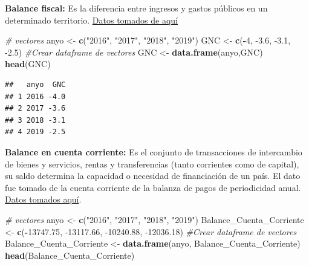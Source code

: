 \documentclass[
  11pt,
  a4paper,
]{book}
\newenvironment{Shaded}{\begin{snugshade}}{\end{snugshade}}
\newcommand{\CommentTok}[1]{\textcolor[rgb]{0.56,0.35,0.01}{\textit{#1}}}
\newcommand{\DecValTok}[1]{\textcolor[rgb]{0.00,0.00,0.81}{#1}}
\newcommand{\FloatTok}[1]{\textcolor[rgb]{0.00,0.00,0.81}{#1}}
\newcommand{\KeywordTok}[1]{\textcolor[rgb]{0.13,0.29,0.53}{\textbf{#1}}}
\newcommand{\NormalTok}[1]{#1}
\newcommand{\OperatorTok}[1]{\textcolor[rgb]{0.81,0.36,0.00}{\textbf{#1}}}
\newcommand{\StringTok}[1]{\textcolor[rgb]{0.31,0.60,0.02}{#1}}
\begin{document}
\textbf{Balance fiscal:} Es la diferencia entre ingresos y gastos
públicos en un determinado territorio.
\href{http://www.urf.gov.co/webcenter/portal/EntidadesFinancieras/pages_EntidadesFinancieras/PoliticaFiscal/bgg/balancefiscalgobiernocentral?_afrLoop=6729623401772216\&_afrWindowMode=2\&Adf-Window-Id=mof7t7k7j\&_afrFS=16\&_afrMT=screen\&_afrMFW=768\&_afrMFH=720\&_afrMFDW=1536\&_afrMFDH=864\&_afrMFC=8\&_afrMFCI=0\&_afrMFM=0\&_afrMFR=120\&_afrMFG=0\&_afrMFS=0\&_afrMFO=0}{Datos
tomados de aquí}

\begin{Shaded}
\begin{Highlighting}[]
\CommentTok{# vectores }
\NormalTok{anyo <-}\StringTok{ }\KeywordTok{c}\NormalTok{(}\StringTok{"2016"}\NormalTok{, }\StringTok{"2017"}\NormalTok{, }\StringTok{"2018"}\NormalTok{, }\StringTok{"2019"}\NormalTok{)}
\NormalTok{GNC <-}\StringTok{ }\KeywordTok{c}\NormalTok{(}\OperatorTok{-}\DecValTok{4}\NormalTok{, }\FloatTok{-3.6}\NormalTok{, }\FloatTok{-3.1}\NormalTok{, }\FloatTok{-2.5}\NormalTok{)}
\CommentTok{#Crear dataframe de vectores}
\NormalTok{GNC <-}\StringTok{ }\KeywordTok{data.frame}\NormalTok{(anyo,GNC)}
\KeywordTok{head}\NormalTok{(GNC)}
\end{Highlighting}
\end{Shaded}

\begin{verbatim}
##   anyo  GNC
## 1 2016 -4.0
## 2 2017 -3.6
## 3 2018 -3.1
## 4 2019 -2.5
\end{verbatim}

\textbf{Balance en cuenta corriente:} Es el conjunto de transacciones de
intercambio de bienes y servicios, rentas y transferencias (tanto
corrientes como de capital), su saldo determina la capacidad o necesidad
de financiación de un país. El dato fue tomado de la cuenta corriente de
la balanza de pagos de periodicidad anual.
\href{https://www.banrep.gov.co/es/estadisticas/balanza-pagos}{Datos
tomados aquí}.

\begin{Shaded}
\begin{Highlighting}[]
\CommentTok{# vectores }
\NormalTok{anyo <-}\StringTok{ }\KeywordTok{c}\NormalTok{(}\StringTok{"2016"}\NormalTok{, }\StringTok{"2017"}\NormalTok{, }\StringTok{"2018"}\NormalTok{, }\StringTok{"2019"}\NormalTok{)}
\NormalTok{Balance_Cuenta_Corriente <-}\StringTok{ }\KeywordTok{c}\NormalTok{(}\OperatorTok{-}\FloatTok{13747.75}\NormalTok{, }\FloatTok{-13117.66}\NormalTok{, }\FloatTok{-10240.88}\NormalTok{, }\FloatTok{-12036.18}\NormalTok{)}
\CommentTok{#Crear dataframe de vectores}
\NormalTok{Balance_Cuenta_Corriente <-}\StringTok{ }\KeywordTok{data.frame}\NormalTok{(anyo, Balance_Cuenta_Corriente)}
\KeywordTok{head}\NormalTok{(Balance_Cuenta_Corriente)}
\end{Highlighting}
\end{Shaded}
\end{document}

